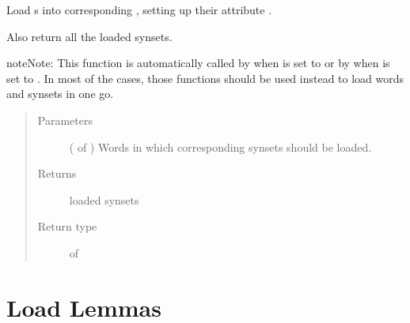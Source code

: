 \documentclass[letterpaper,10pt,english]{sphinxmanual}
\begin{document}

\begin{fulllineitems}
\label{\detokenize{load:loacore.load.synset_load.load_synsets_in_words}}
Load  s into corresponding , setting up their attribute .

Also return all the loaded synsets.

\begin{sphinxadmonition}{note}{Note:}
This function is automatically called by  when  is set to
 or by  when  is set to .
In most of the cases, those functions should be used instead to load words and synsets in one go.
\end{sphinxadmonition}
\begin{quote}\begin{description}
\item[{Parameters}] \leavevmode
{} ( of ) \textendash{} Words in which corresponding synsets should be loaded.

\item[{Returns}] \leavevmode
loaded synsets

\item[{Return type}] \leavevmode
{} of 

\end{description}\end{quote}

\end{fulllineitems}



\section{Load Lemmas}
\label{\detokenize{load:module-loacore.load.lemma_load}}\label{\detokenize{load:load-lemmas}}
\end{document}
